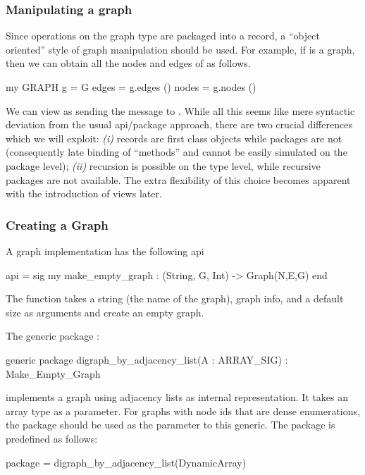 \subsubsection{Manipulating a graph}
 
Since operations on the graph type are packaged into
a record, a ``object oriented'' style of graph manipulation should be used.
For example, if  is a graph, then we can obtain all the
nodes and edges of  as follows.
\begin{SML}
 my GRAPH g = G
 edges = g.edges ()
 nodes = g.nodes ()
\end{SML}
We can view  as sending the message to .
While all this seems like mere syntactic deviation from the usual
 api/package approach, there are two crucial differences which
we will exploit:
\emph{(i)} records are first class objects 
while packages are not (consequently
late binding of ``methods'' and cannot be easily simulated on the
package level); \emph{(ii)} recursion
is possible on the type level, while recursive packages are not available.
The extra flexibility of this choice becomes apparent with the
introduction of views later. 

\subsubsection{Creating a Graph}

A graph implementation has the following api
\begin{SML}
 api  = sig
   my make_empty_graph : (String, G, Int) -> Graph(N,E,G)
 end
\end{SML}
The function  takes a string (the name of the graph),
graph info, and a default size as arguments and create an empty graph.

The generic package :
\begin{SML}
 generic package digraph_by_adjacency_list(A : ARRAY_SIG) : Make_Empty_Graph
\end{SML}
implements a graph using adjacency lists as internal representation.
It takes an array type as a parameter.  For graphs with
node ids that are dense enumerations, the  package
should be used as the parameter to this generic. 
The package  is predefined as follows:
\begin{SML}
 package  = digraph_by_adjacency_list(DynamicArray)
\end{SML}

